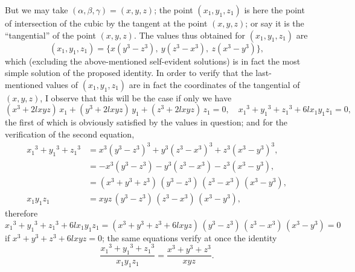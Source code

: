 \documentclass[11pt,a4paper]{article}
\begin{document}
But we may take $(\alpha, \beta, \gamma) = (x, y, z)$; the point $(x_1, y_1, z_1)$ is here the point of
intersection of the cubic by the tangent at the point $(x, y, z)$; or say it is the
``tangential'' of the point $(x, y, z)$. The values thus obtained for $(x_1, y_1, z_1)$ are
\[
(x_1, y_1, z_1) = \{x(y^3-z^3),\ y(z^3-x^3),\ z(x^3-y^3)\},
\]
which (excluding the above-mentioned self-evident solutions) is in fact the most simple
solution of the proposed identity. In order to verify that the last-mentioned values
of $(x_1, y_1, z_1)$ are in fact the coordinates of the tangential of $(x, y, z)$, I observe that
this will be the case if only we have
\[
(x^3+2lxyz)\,x_1 + (y^3+2lxyz)\,y_1 + (z^3+2lxyz)\,z_1 = 0, \quad x_1{}^3+y_1{}^3+z_1{}^3+6lx_1y_1z_1=0,
\]
the first of which is obviously satisfied by the values in question; and for the verification
of the second equation,
\begin{align*}
x_1{}^3+y_1{}^3+z_1{}^3 &= x^3(y^3-z^3)^3 + y^3(z^3-x^3)^3 + z^3(x^3-y^3)^3,\\
&= -x^3(y^3-z^3) - y^3(z^3-x^3) - z^3(x^3-y^3),\\
&= (x^3+y^3+z^3)\,(y^3-z^3)\,(z^3-x^3)\,(x^3-y^3),\\
x_1y_1z_1 &= xyz\,(y^3-z^3)\,(z^3-x^3)\,(x^3-y^3),
\end{align*}
therefore
\[
x_1{}^3+y_1{}^3+z_1{}^3+6lx_1y_1z_1 = (x^3+y^3+z^3+6lxyz)\,(y^3-z^3)\,(z^3-x^3)\,(x^3-y^3) = 0
\]
if $x^3+y^3+z^3+6lxyz=0$; the same equations verify at once the identity
\[
\frac{x_1{}^3+y_1{}^3+z_1{}^3}{x_1y_1z_1} = \frac{x^3+y^3+z^3}{xyz}.
\]
\end{document}
